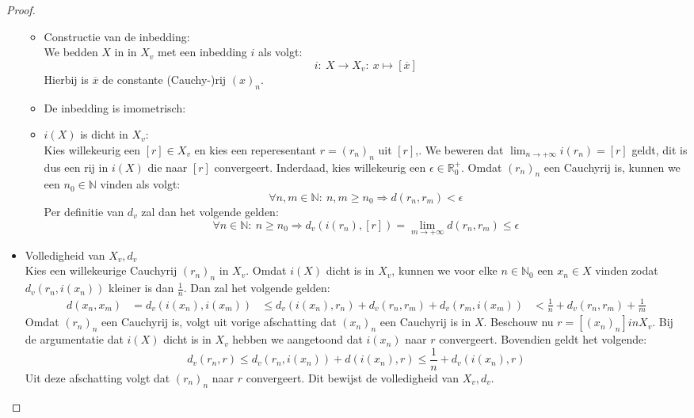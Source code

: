 \documentclass[main.tex]{subfiles}
\begin{document}
\begin{bst}
\begin{proof}
\begin{itemize}
      \begin{itemize}
      \item Constructie van de inbedding:\\
        We bedden $X$ in in $X_{v}$ met een inbedding $i$ als volgt:
        \[ i:\ X \rightarrow X_{v}:\ x \mapsto [\overline{x}] \]
        Hierbij is $\overline{x}$ de constante (Cauchy-)rij $(x)_{n}$.
      \item De inbedding is imometrisch:
      \item $i(X)$ is dicht in $X_{v}$:\\
        Kies willekeurig een $[r] \in X_{v}$ en kies een reperesentant $r=(r_{n})_{n}$ uit $[r]$,.
        We beweren dat $\lim_{n\rightarrow +\infty}i(r_{n}) = [r]$ geldt, dit is dus een rij in $i(X)$ die naar $[r]$ convergeert.
        Inderdaad, kies willekeurig een $\epsilon\in\mathbb{R}_{0}^{+}$.
        Omdat $(r_{n})_{n}$ een Cauchyrij is, kunnen we een $n_{0}\in\mathbb{N}$ vinden als volgt:
        \[ \forall n,m\in\mathbb{N}:\ n,m \ge n_{0} \Rightarrow d(r_{n},r_{m}) < \epsilon \]
        Per definitie van $d_{v}$ zal dan het volgende gelden:
        \[ \forall n\in\mathbb{N}:\ n\ge n_{0} \Rightarrow d_{v}(i(r_{n}),[r]) = \lim_{m\rightarrow +\infty}d(r_{n},r_{m}) \le \epsilon \]
      \end{itemize}      
    \item Volledigheid van $X_{v},d_{v}$\\
      Kies een willekeurige Cauchyrij $(r_{n})_{n}$ in $X_{v}$.
      Omdat $i(X)$ dicht is in $X_{v}$, kunnen we voor elke $n\in\mathbb{N}_{0}$ een $x_{n}\in X$ vinden zodat $d_{v}(r_{n},i(x_{n}))$ kleiner is dan $\frac{1}{n}$.
      Dan zal het volgende gelden:
      \begin{align*}
        d(x_{n},x_{m})
        &= d_{v}(i(x_{n}),i(x_{m}))
        &\le d_{v}(i(x_{n}),r_{n}) + d_{v}(r_{n},r_{m}) + d_{v}(r_{m},i(x_{m}))
        &< \frac{1}{n} + d_{v}(r_{n},r_{m}) + \frac{1}{m}
      \end{align*}
      Omdat $(r_{n})_{n}$ een Cauchyrij is, volgt uit vorige afschatting dat $(x_{n})_{n}$ een Cauchyrij is in $X$.
      Beschouw nu $r = [(x_{n})_{n}] in X_{v}$.
      Bij de argumentatie dat $i(X)$ dicht is in $X_{v}$ hebben we aangetoond dat $i(x_{n})$ naar $r$ convergeert.
      Bovendien geldt het volgende:
      \[ d_{v}(r_{n},r) \le d_{v}(r_{n},i(x_{n})) + d(i(x_{n}),r) \le \frac{1}{n} + d_{v}(i(x_{n}),r) \]
      Uit deze afschatting volgt dat $(r_{n})_{n}$ naar $r$ convergeert.
      Dit bewijst de volledigheid van $X_{v},d_{v}$.
    \end{itemize}
  \end{proof}
\end{bst}
\end{document}
